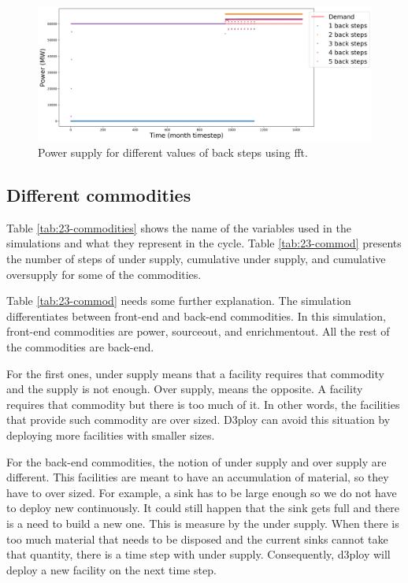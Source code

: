 \documentclass[11pt]{article}
\begin{document}
\begin{figure}[!h]
	\centering
	\includegraphics[width=\textwidth]{23-figures/23-power-buffer0-fft-back.png} 
	\hfill
	\caption{Power supply for different values of back steps using fft.}
	\label{fig:23-back-fft}
\end{figure}

\subsection{Different commodities}

Table \ref{tab:23-commodities} shows the name of the variables used in the simulations and what they represent in the cycle. Table \ref{tab:23-commod} presents the number of steps of under supply, cumulative under supply, and cumulative oversupply for some of the commodities.

Table \ref{tab:23-commod} needs some further explanation. The simulation differentiates between front-end and back-end commodities. In this simulation, front-end commodities are power, sourceout, and enrichmentout. All the rest of the commodities are back-end. 

For the first ones, under supply means that a facility requires that commodity and the supply is not enough. Over supply, means the opposite. A facility requires that commodity but there is too much of it. In other words, the facilities that provide such commodity are over sized. D3ploy can avoid this situation by deploying more facilities with smaller sizes.

For the back-end commodities, the notion of under supply and over supply are different. This facilities are meant to have an accumulation of material, so they have to over sized. For example, a sink has to be large enough so we do not have to deploy new continuously. It could still happen that the sink gets full and there is a need to build a new one. This is measure by the under supply. When there is too much material that needs to be disposed and the current sinks cannot take that quantity, there is a time step with under supply. Consequently, d3ploy will deploy a new facility on the next time step.
\end{document}
